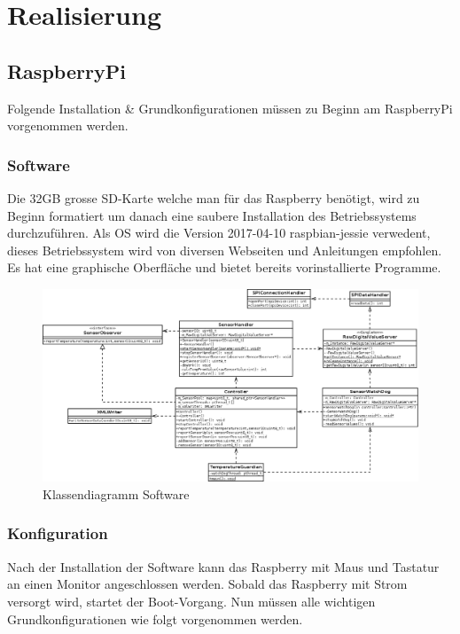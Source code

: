 \section{Realisierung}

\subsection{RaspberryPi}

Folgende Installation \& Grundkonfigurationen müssen zu Beginn am RaspberryPi vorgenommen werden.

\subsubsection{Software}
Die 32GB grosse SD-Karte welche man für das Raspberry benötigt, wird zu Beginn formatiert um danach eine saubere Installation des Betriebssystems durchzuführen. Als OS wird die Version 2017-04-10 raspbian-jessie verwedent, dieses Betriebssystem wird von diversen Webseiten und Anleitungen empfohlen. Es hat eine graphische Oberfläche und bietet bereits vorinstallierte Programme.

\begin{figure}[H]%
\centering
\includegraphics[width=1\textwidth]{Images/Klassendiagramm.png}
\caption{Klassendiagramm Software}
\label{fig:classdia}
\end{figure}

\subsubsection{Konfiguration}
Nach der Installation der Software kann das Raspberry mit Maus und Tastatur an einen Monitor angeschlossen werden. Sobald das Raspberry mit Strom versorgt wird, startet der Boot-Vorgang.
Nun müssen alle wichtigen Grundkonfigurationen wie folgt vorgenommen werden.

